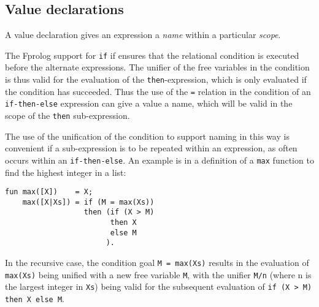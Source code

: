 \documentclass[a4paper,11pt,twoside]{article}
\begin{document}
\subsection{Value declarations}
\label{val}

A value declaration gives an expression a \textit{name} within a
particular \textit{scope}.

The Fprolog support for \texttt{if} if ensures that the relational
condition is executed before the alternate expressions.  The
unifier of the free variables in the condition is thus valid for
the evaluation of the \texttt{then}-expression, which is only
evaluated if the condition has succeeded.  Thus the use of the
\texttt{=} relation in the condition of an
\texttt{if-then-else} expression can give a value a name, which will
be valid in the scope of the \texttt{then} sub-expression.

The use of the unification of the condition to support naming in this
way is convenient if a sub-expression is to be repeated within an
expression, as often occurs within an \texttt{if-then-else}.  An
example is in a definition of a \texttt{max} function to find
the highest integer in a list:
\begin{verbatim}
fun max([X])    = X;
    max([X|Xs]) = if (M = max(Xs))
                  then (if (X > M)
                        then X
                        else M
                       ).
\end{verbatim}
In the recursive case,  the condition goal \texttt{M = max(Xs)} results
in the evaluation of \texttt{max(Xs)} being unified with a new free
variable \texttt{M}, with the unifier \texttt{M/n} (where n is the
largest integer in \texttt{Xs}) being valid for the subsequent
evaluation of \texttt{if (X > M) then X else M}.
\end{document}
